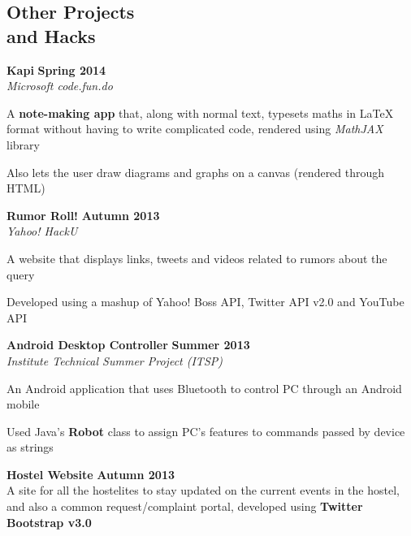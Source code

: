 \documentclass[margin,11pt]{resume}
\begin{document}
\begin{resume}
\section{\mysidestyle Other Projects \\ and Hacks}
\textbf{Kapi} \hfill \textbf{Spring 2014}\\
\textsl{Microsoft code.fun.do}
\begin{list2}
\item A \textbf{note-making app} that, along with normal text, typesets maths in \LaTeX{} format without having to write complicated code, rendered using \textsl{MathJAX} library
\item Also lets the user draw diagrams and graphs on a canvas (rendered through HTML)
\end{list2}
\vspace{-2.5mm}
\textbf{Rumor Roll!} \hfill \textbf{Autumn 2013}\\
\textsl{Yahoo! HackU}
\begin{list2}
\item A website that displays links, tweets and videos related to rumors about the query
\item Developed using a mashup of Yahoo! Boss API, Twitter API v2.0 and YouTube API
\end{list2}
\vspace{-2.5mm}
\textbf{Android Desktop Controller} \hfill \textbf{Summer 2013}\\
\textsl{Institute Technical Summer Project (ITSP)}
\begin{list2}
\item An Android application that uses Bluetooth to control PC through an Android mobile 
\item Used Java's \textbf{Robot} class to assign PC's features to commands passed by device as strings
\end{list2}
\vspace{-2.5mm}
\textbf{Hostel Website} \hfill \textbf{Autumn 2013}\\
A site for all the hostelites to stay updated on the current events in the hostel, and also a common request/complaint portal, developed using \textbf{Twitter Bootstrap v3.0}



\pagebreak

\vspace{-150em}


\end{resume}
\end{document}
